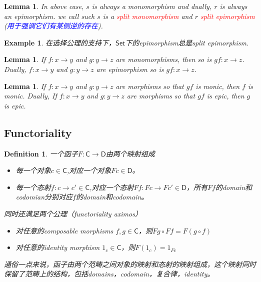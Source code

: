 \documentclass{article}
\newtheorem{lemma}[theorem]{Lemma}
\newtheorem{example}[theorem]{Example}
\newtheorem{definition}[theorem]{Definition}
\newcommand*{\cat}[1]{\textsf{#1}\xspace}
\newcommand*{\xfunc}[4]{{#2}\colon{#3}{#1}{#4}}
\newcommand*{\func}[3]{\xfunc{\to}{#1}{#2}{#3}}
\newcommand{\redt}[1]{\textcolor{red}{#1}}
\newcommand{\bluet}[1]{\textcolor{blue}{#1}}
\begin{document}
\begin{lemma}
\rm In above case, $s$ is always a monomorphism and dually, $r$ is always an epimorphism. we call such $s$ is a \redt{split monomorphism} and $r$ \redt{split epimorphism} (\bluet{用于强调它们有某侧逆的存在}). 
\end{lemma}

\begin{example}
\rm 在选择公理的支持下，$\cat{Set}$下的epimorphism总是split epimorphism. 
\end{example}

\begin{lemma}
\rm If $\func{f}{x}{y}$ and $\func{g}{y}{z}$ are monomorphisms, then so is $\func{gf}{x}{z}$. Dually, $\func{f}{x}{y}$ and $\func{g}{y}{z}$ are epimorphism so is $\func{gf}{x}{z}$.
\end{lemma}

\begin{lemma}
\rm If $\func{f}{x}{y}$ and $\func{g}{y}{z}$ are morphisms so that $gf$ is monic, then $f$ is monic. Dually, If $\func{f}{x}{y}$ and $\func{g}{y}{z}$ are morphisms so that $gf$ is epic, then $g$ is epic.
\end{lemma}

\newpage
\subsection{Functoriality}


\begin{definition}
\rm 一个函子$F \colon \cat{C} \rightarrow \cat{D}$由两个映射组成
\begin{itemize}
 \item 每一个对象$c \in \cat{C}$,对应一个对象$Fc \in \cat{D}$。
 \item 每一个态射$f \colon c \rightarrow	c' \in \cat{C}$,对应一个态射$Ff \colon Fc \rightarrow Fc' \in \cat{D}$，所有$Ff$的domain和codomian分别对应$f$的domain和codomain。 
\end{itemize}
同时还满足两个公理（functoriality aximos）
\begin{itemize}
 	\item 对任意的composable morphisms $f,g \in \cat{C}$，则$Fg \circ Ff = F(g \circ f)$
 	\item 对任意的identity morphism $1_c \in \cat{C}$，则$F(1_c)=1_{Fc}$
\end{itemize}
通俗一点来说，函子由两个范畴之间对象的映射和态射的映射组成，这个映射同时保留了范畴上的结构，包括domains，codomain，复合律，identity。
\end{definition}
\end{document}
